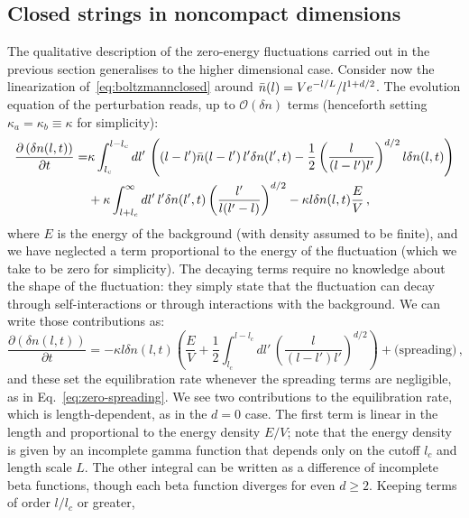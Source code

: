 \documentclass[a4paper,11pt]{article}
\newcommand{\lr}[1]{\left(#1\right)}
\begin{document}
\subsection{Closed strings in noncompact dimensions}
The qualitative description of the zero-energy fluctuations carried out in the previous section generalises to the higher dimensional case.
Consider now the linearization of~\eqref{eq:boltzmannclosed} around $\Bar{n}(l)=V e^{-l/L}/l^{1+d/2}$.
The evolution equation of the perturbation reads, up to $\mathcal{O}\lr{\delta n}$ terms (henceforth setting $\kappa_a=\kappa_b\equiv \kappa$ for simplicity):
\begin{equation}\label{eq:linearized-qualitative}
    \begin{split}
     \frac{\partial \lr{\delta n(l,t)}}{\partial t}= & 
     \kappa\int_{l_c}^{l-l_c}{dl'\,\lr{ (l-l')\Bar{n}(l-l')\,l'\delta n(l',t)-\frac{1}{2}\lr{\frac{l}{(l-l')l'}}^{d/2}l\delta n(l,t) }}
     \\ & 
     +\kappa \int_{l+l_c}^\infty{dl' \,  l'\delta n(l',t)\lr{\frac{l'}{l(l'-l)}}^{d/2}}-\kappa l\delta n(l,t)\frac{E}{V} \, ,
\end{split}
\end{equation}
where $E$ is the energy of the background (with density assumed to be finite), and we have neglected a term proportional to the energy of the fluctuation (which we take to be zero for simplicity).
The decaying terms require no knowledge about the shape of the fluctuation: they simply state that the fluctuation can decay through self-interactions or through interactions with the background.
We can write those contributions as:
\begin{equation}\label{closedncboltz}
     \frac{\partial \lr{\delta n(l,t)}}{\partial t}= 
     -\kappa l\delta n(l,t) \lr{\frac{E}{V}+ \frac{1}{2}\int_{l_c}^{l-l_c}{dl'\,\lr{\frac{l}{(l-l')l'}}^{d/2} }}+ \text{(spreading)} \, ,
\end{equation}
and these set the equilibration rate whenever the spreading terms are negligible, as in Eq.~\eqref{eq:zero-spreading}.
We see two contributions to the equilibration rate, which is length-dependent,
as in the $d=0$ case. The first term is linear in the length and proportional
to the energy density $E/V$; note that the energy density is given by an
incomplete gamma function that depends only on the cutoff $l_c$ and length
scale $L$. The other integral can be written as a difference of incomplete
beta functions, though each beta function diverges for even $d\geq 2$.
Keeping terms of order $l/l_c$ or greater,
\end{document}
